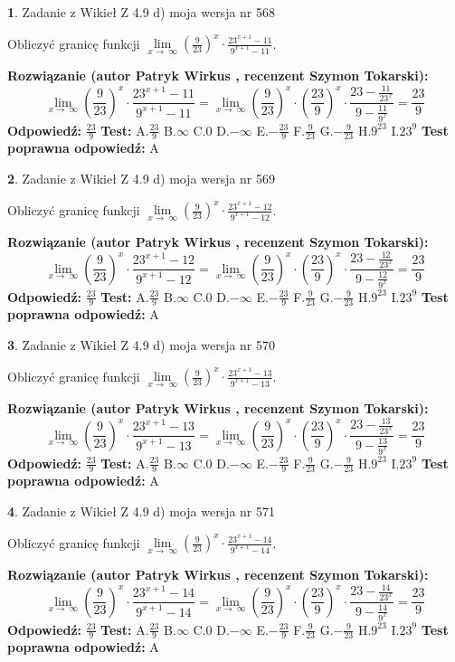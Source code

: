 \documentclass[12pt, a4paper]{article}
\theoremstyle{definition} %
\newtheorem{zad}{}
\newcommand{\zadStart}[1]{\begin{zad}#1\newline}
\newcommand{\zadStop}{\end{zad}}
\newcommand{\rozwStart}[2]{\noindent \textbf{Rozwiązanie (autor #1 , recenzent #2): }\newline}
\newcommand{\rozwStop}{\newline}
\newcommand{\odpStart}{\noindent \textbf{Odpowiedź:}\newline}
\newcommand{\odpStop}{\newline}
\newcommand{\testStart}{\noindent \textbf{Test:}\newline}
\newcommand{\testStop}{\newline}
\newcommand{\kluczStart}{\noindent \textbf{Test poprawna odpowiedź:}\newline}
\newcommand{\kluczStop}{\newline}
\begin{document}
\zadStart{Zadanie z Wikieł Z 4.9 d) moja wersja nr 568}


Obliczyć granicę funkcji  $\lim\limits_{x\to\ \infty}(\frac{9}{23})^{x}\cdot\frac{23^{x+1}-11}{9^{x+1}-11}$.
\zadStop
\rozwStart{Patryk Wirkus}{Szymon Tokarski}
$$\lim\limits_{x\to\ \infty}(\frac{9}{23})^{x}\cdot\frac{23^{x+1}-11}{9^{x+1}-11}=\lim\limits_{x\to\ \infty}(\frac{9}{23})^{x}\cdot(\frac{23}{9})^{x} \cdot \frac{23-\frac{11}{23^{x}}}{9-\frac{11}{9^{x}}} = \frac{23}{9}$$
\rozwStop
\odpStart
$\frac{23}{9}$
\odpStop
\testStart
A.$\frac{23}{9}$ B.$\infty$ C.$0$ D.$-\infty$ E.$-\frac{23}{9}$
F.$\frac{9}{23}$ G.$-\frac{9}{23}$
H.$9^{23}$
I.$23^{9}$
\testStop
\kluczStart
A
\kluczStop



\zadStart{Zadanie z Wikieł Z 4.9 d) moja wersja nr 569}


Obliczyć granicę funkcji  $\lim\limits_{x\to\ \infty}(\frac{9}{23})^{x}\cdot\frac{23^{x+1}-12}{9^{x+1}-12}$.
\zadStop
\rozwStart{Patryk Wirkus}{Szymon Tokarski}
$$\lim\limits_{x\to\ \infty}(\frac{9}{23})^{x}\cdot\frac{23^{x+1}-12}{9^{x+1}-12}=\lim\limits_{x\to\ \infty}(\frac{9}{23})^{x}\cdot(\frac{23}{9})^{x} \cdot \frac{23-\frac{12}{23^{x}}}{9-\frac{12}{9^{x}}} = \frac{23}{9}$$
\rozwStop
\odpStart
$\frac{23}{9}$
\odpStop
\testStart
A.$\frac{23}{9}$ B.$\infty$ C.$0$ D.$-\infty$ E.$-\frac{23}{9}$
F.$\frac{9}{23}$ G.$-\frac{9}{23}$
H.$9^{23}$
I.$23^{9}$
\testStop
\kluczStart
A
\kluczStop



\zadStart{Zadanie z Wikieł Z 4.9 d) moja wersja nr 570}


Obliczyć granicę funkcji  $\lim\limits_{x\to\ \infty}(\frac{9}{23})^{x}\cdot\frac{23^{x+1}-13}{9^{x+1}-13}$.
\zadStop
\rozwStart{Patryk Wirkus}{Szymon Tokarski}
$$\lim\limits_{x\to\ \infty}(\frac{9}{23})^{x}\cdot\frac{23^{x+1}-13}{9^{x+1}-13}=\lim\limits_{x\to\ \infty}(\frac{9}{23})^{x}\cdot(\frac{23}{9})^{x} \cdot \frac{23-\frac{13}{23^{x}}}{9-\frac{13}{9^{x}}} = \frac{23}{9}$$
\rozwStop
\odpStart
$\frac{23}{9}$
\odpStop
\testStart
A.$\frac{23}{9}$ B.$\infty$ C.$0$ D.$-\infty$ E.$-\frac{23}{9}$
F.$\frac{9}{23}$ G.$-\frac{9}{23}$
H.$9^{23}$
I.$23^{9}$
\testStop
\kluczStart
A
\kluczStop



\zadStart{Zadanie z Wikieł Z 4.9 d) moja wersja nr 571}


Obliczyć granicę funkcji  $\lim\limits_{x\to\ \infty}(\frac{9}{23})^{x}\cdot\frac{23^{x+1}-14}{9^{x+1}-14}$.
\zadStop
\rozwStart{Patryk Wirkus}{Szymon Tokarski}
$$\lim\limits_{x\to\ \infty}(\frac{9}{23})^{x}\cdot\frac{23^{x+1}-14}{9^{x+1}-14}=\lim\limits_{x\to\ \infty}(\frac{9}{23})^{x}\cdot(\frac{23}{9})^{x} \cdot \frac{23-\frac{14}{23^{x}}}{9-\frac{14}{9^{x}}} = \frac{23}{9}$$
\rozwStop
\odpStart
$\frac{23}{9}$
\odpStop
\testStart
A.$\frac{23}{9}$ B.$\infty$ C.$0$ D.$-\infty$ E.$-\frac{23}{9}$
F.$\frac{9}{23}$ G.$-\frac{9}{23}$
H.$9^{23}$
I.$23^{9}$
\testStop
\kluczStart
A
\kluczStop
\end{document}
